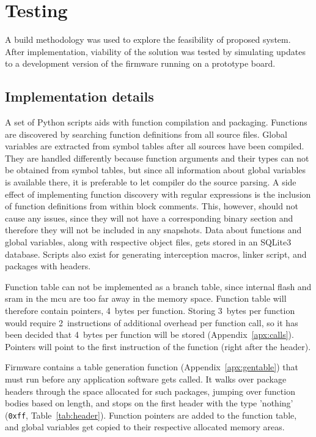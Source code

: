 \newpage
\section{Testing}
\label{s:testing}

A build methodology was used to explore the feasibility of proposed system. After implementation, viability of the solution was tested by simulating updates to a development version of the firmware running on a prototype board.

\subsection{Implementation details}

A set of Python scripts aids with function compilation and packaging. Functions are discovered by searching function definitions from all source files. Global variables are extracted from symbol tables after all sources have been compiled. They are handled differently because function arguments and their types can not be obtained from symbol tables, but since all information about global variables is available there, it is preferable to let compiler do the source parsing. A side effect of implementing function discovery with regular expressions is the inclusion of function definitions from within block comments. This, however, should not cause any issues, since they will not have a corresponding binary section and therefore they will not be included in any snapshots. Data about functions and global variables, along with respective object files, gets stored in an SQLite3 database. Scripts also exist for generating interception macros, linker script, and packages with headers.

Function table can not be implemented as a branch table, since internal flash and \gls{sram} in the \gls{mcu} are too far away in the memory space. Function table will therefore contain pointers, 4~bytes per function. Storing 3~bytes per function would require 2~instructions of additional overhead per function call, so it has been decided that 4~bytes per function will be stored (Appendix~\ref{apx:calls}). Pointers will point to the first instruction of the function (right after the header).

Firmware contains a table generation function (Appendix~\ref{apx:gentable}) that must run before any application software gets called. It walks over package headers through the space allocated for such packages, jumping over function bodies based on length, and stops on the first header with the type 'nothing' (\texttt{0xff}, Table~\ref{tab:header}). Function pointers are added to the function table, and global variables get copied to their respective allocated memory areas.

